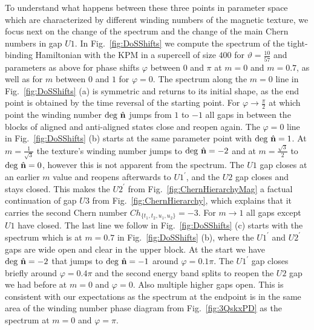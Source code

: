 \documentclass[submission, Phys]{SciPost}
\begin{document}
\figureIXa

To understand what happens between these three points in parameter space which are characterized by different winding numbers of the magnetic texture, we focus next on the change of the spectrum and the change of the main Chern numbers in gap $U1$.
In Fig.~\ref{fig:DoSShifts} we compute the spectrum of the tight-binding Hamiltonian with the KPM in a supercell of size $400$ for $\vartheta=\frac{10}{57}$ and parameters as above for phase shifts $\varphi$ between $0$ and $\pi$ at $m=0$ and $m=0.7$, as well as for $m$ between $0$ and $1$ for $\varphi=0$.
The spectrum along the $m=0$ line in Fig.~\ref{fig:DoSShifts} (a) is symmetric and returns to its initial shape, as the end point is obtained by the time reversal of the starting point.
For $\varphi\to\frac{\pi}{2}$ at which point the winding number $\mathrm{deg}~\hat{\mathbf{n}}$ jumps from $1$ to $-1$ all gaps in between the blocks of aligned and anti-aligned states close and reopen again.
The $\varphi=0$ line in Fig.~\ref{fig:DoSShifts} (b) starts at the same parameter point with $\mathrm{deg}~\hat{\mathbf{n}}=1$.
At $m=\frac{1}{\sqrt{3}}$ the texture's winding number jumps to $\mathrm{deg}~\hat{\mathbf{n}}=-2$ and at $m=\frac{\sqrt{3}}{2}$ to $\mathrm{deg}~\hat{\mathbf{n}}=0$, however this is not apparent from the spectrum. The $U1$ gap closes at an earlier $m$ value and reopens afterwards to $U1^{\prime}$, and the $U2$ gap closes and stays closed.
This makes the $U2^{\prime}$ from Fig.~\ref{fig:ChernHierarchyMag} a factual  continuation of gap $U3$ from Fig.~\ref{fig:ChernHierarchy}, which explains that it carries the second Chern number $Ch_{\lbrace t_1, t_2, u_1, u_2 \rbrace }=-3$.
For $m\to1$ all gaps except $U1$ have closed.
The last line we follow in Fig.~\ref{fig:DoSShifts} (c) starts with the spectrum which is at $m=0.7$ in Fig.~\ref{fig:DoSShifts} (b), where the $U1^{\prime}$  and $U2^{\prime}$ gaps are wide open and clear in the upper block. At the start we have $\mathrm{deg}~\hat{\mathbf{n}}=-2$ that jumps to $\mathrm{deg}~\hat{\mathbf{n}}=-1$ around $\varphi=0.1\pi$. The $U1^{\prime}$  
gap closes briefly around $\varphi=0.4\pi$ and the second energy band splits to reopen the $U2$ gap we had before at $m=0$ and $\varphi=0$. Also multiple higher gaps open.
This is consistent with our expectations as the spectrum at the endpoint is in the same area of the winding number phase diagram from Fig.~\ref{fig:3QskxPD} as the spectrum at $m=0$ and $\varphi=\pi$.
\end{document}
